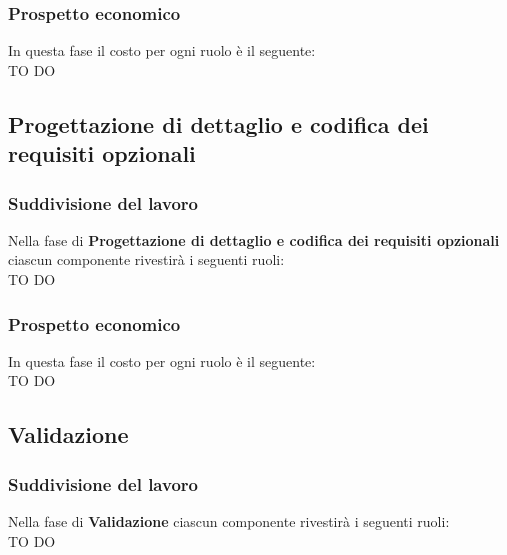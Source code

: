 		\subsubsection{Prospetto economico} %
		\label{ssub:prospetto_economico}
		In questa fase il costo per ogni ruolo è il seguente: \\
		TO DO
		
	
	\subsection{Progettazione di dettaglio e codifica dei requisiti opzionali} %
	\label{sub:progettazione_di_dettaglio_e_codifica_dei_requisiti_opzionali}
		\subsubsection{Suddivisione del lavoro} %
		\label{ssub:suddivisione_del_lavoro}
		Nella fase di \textbf{Progettazione di dettaglio e codifica dei requisiti opzionali} ciascun componente rivestirà i seguenti ruoli: \\
		TO DO
		
		\subsubsection{Prospetto economico} %
		\label{ssub:prospetto_economico}
		In questa fase il costo per ogni ruolo è il seguente: \\
		TO DO
		
	
	\subsection{Validazione} %
	\label{sub:validazione}
		\subsubsection{Suddivisione del lavoro} %
		\label{ssub:suddivisione_del_lavoro}
		Nella fase di \textbf{Validazione} ciascun componente rivestirà i seguenti ruoli: \\
		TO DO
		
